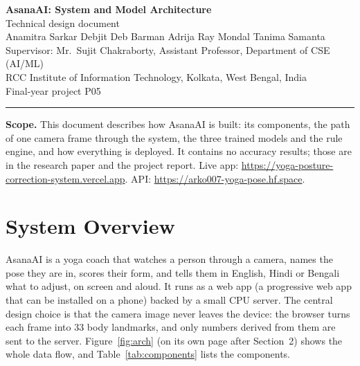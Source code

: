 \documentclass[11pt,a4paper]{article}
\begin{document}
\begin{center}
{\LARGE\bfseries AsanaAI: System and Model Architecture}\\[6pt]
{\large Technical design document}\\[10pt]
Anamitra Sarkar \quad Debjit Deb Barman \quad Adrija Ray Mondal \quad Tanima Samanta\\[3pt]
Supervisor: Mr.\ Sujit Chakraborty, Assistant Professor, Department of CSE (AI/ML)\\[2pt]
RCC Institute of Information Technology, Kolkata, West Bengal, India\\[2pt]
Final-year project P05
\end{center}
\vspace{4pt}
\hrule
\vspace{6pt}

\noindent\textbf{Scope.} This document describes how AsanaAI is built: its components, the path of one camera frame through the system, the three trained models and the rule engine, and how everything is deployed. It contains no accuracy results; those are in the research paper and the project report. Live app: \url{https://yoga-posture-correction-system.vercel.app}. API: \url{https://arko007-yoga-pose.hf.space}.

\tableofcontents
\clearpage

\section{System Overview}
AsanaAI is a yoga coach that watches a person through a camera, names the pose they are in, scores their form, and tells them in English, Hindi or Bengali what to adjust, on screen and aloud. It runs as a web app (a progressive web app that can be installed on a phone) backed by a small CPU server. The central design choice is that the camera image never leaves the device: the browser turns each frame into 33 body landmarks, and only numbers derived from them are sent to the server. Figure~\ref{fig:arch} (on its own page after Section~2) shows the whole data flow, and Table~\ref{tab:components} lists the components.
\end{document}

